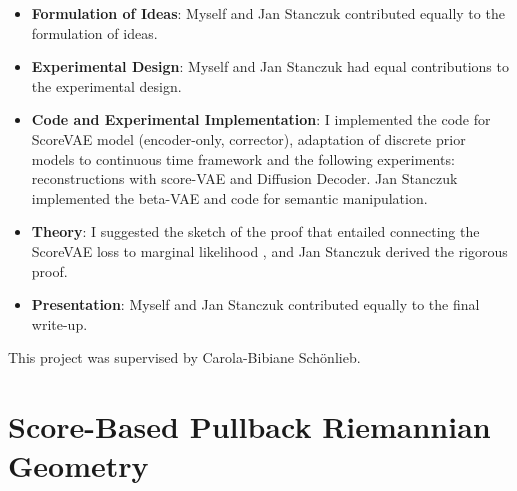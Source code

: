\begin{itemize}
\item \textbf{Formulation of Ideas}: Myself and Jan Stanczuk contributed equally to the formulation of ideas.
\item \textbf{Experimental Design}: Myself and Jan Stanczuk had equal contributions to the experimental design.
\item \textbf{Code and Experimental Implementation}: I implemented the code for ScoreVAE model (encoder-only, corrector), adaptation of discrete prior models to continuous time framework and the following experiments: reconstructions with score-VAE and Diffusion Decoder. Jan Stanczuk implemented the beta-VAE and code for semantic manipulation.
\item \textbf{Theory}: I suggested the sketch of the proof that entailed connecting the ScoreVAE loss to marginal likelihood \cite{song2021maximum}, and Jan Stanczuk derived the rigorous proof.
\item \textbf{Presentation}: Myself and Jan Stanczuk contributed equally to the final write-up.
\end{itemize}

This project was supervised by Carola-Bibiane Sch\"onlieb.

\section{Score-Based Pullback Riemannian Geometry}

